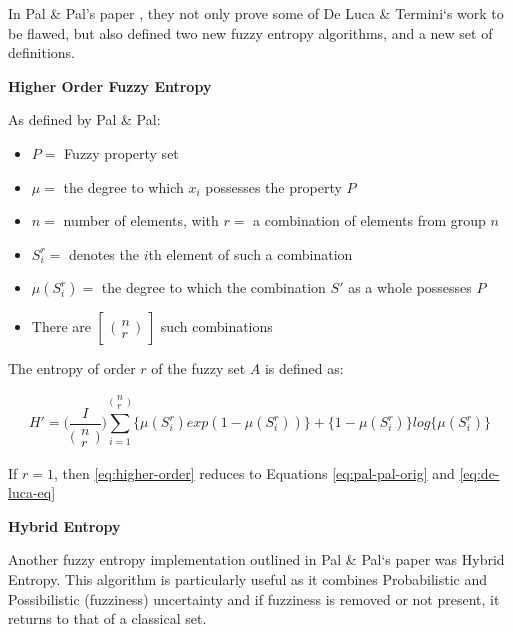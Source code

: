 In Pal \& Pal's paper  \cite{Pal_Pal_1992}, they not only prove some of De Luca \& Termini`s work to be flawed, but also defined two new fuzzy entropy algorithms, and a new set of definitions.

\noindent \textbf{Higher Order Fuzzy Entropy}

As defined by Pal \& Pal:

\begin{itemize}
  \item $P = $ Fuzzy property set
  \item $\mu =$ the degree to which $x_i$ possesses the property $P$
  \item $n =$ number of elements, with $r =$ a combination of elements from group $n$
  \item $S^r_i =$ denotes the $i$th element of such a combination
  \item $\mu(S^r_i) =$ the degree to which the combination $S'$ as a whole possesses $P$
  \item There are $\begin{bmatrix} \bigl(\begin{smallmatrix}
  n \\ r
  \end{smallmatrix} \bigr) \end{bmatrix}$ such combinations
\end{itemize}

The entropy of order $r$ of the fuzzy set $A$ is defined as:

\begin{equation} \label{eq:higher-order}
  H' = \bigg(\frac{I}{\bigl(\begin{smallmatrix}
  n \\ r
\end{smallmatrix} \bigr)}\bigg) \displaystyle\sum_{i=1}^{\bigl(\begin{smallmatrix}
  n \\ r
  \end{smallmatrix} \bigr)} \{ \mu(S^r_i)exp(1 - \mu(S^r_i)) \} + \{ 1 - \mu(S^r_i) \}log\{\mu(S^r_i)\}
\end{equation}

If $r = 1$, then \eqref{eq:higher-order} reduces to Equations \eqref{eq:pal-pal-orig} and \eqref{eq:de-luca-eq}

\noindent \textbf{Hybrid Entropy}

Another fuzzy entropy implementation outlined in Pal \& Pal`s paper was Hybrid Entropy. This algorithm is particularly useful as it combines Probabilistic and Possibilistic (fuzziness) uncertainty and if fuzziness is removed or not present, it returns to that of a classical set.

